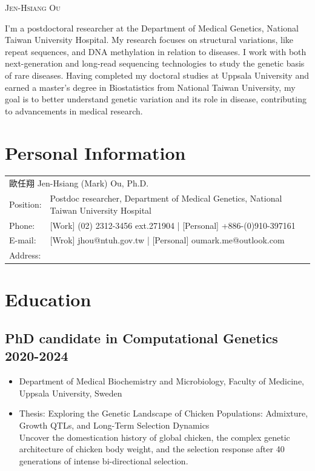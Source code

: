 \documentclass[10pt]{article}
\makeatletter
\def\phone{+886-(0)910-397161}
\def\address{7F.-3, No. 7, Dongfeng St., Taipei, Taiwan}
\def\email{oumark.me@outlook.com}
\def\web{www.oumark.net}
\makeatother
\begin{document}
\begin{center}
{\LARGE\scshape Jen-Hsiang Ou}\\[2pt]
\end{center}


\vspace{16pt}
I'm a postdoctoral researcher at the Department of Medical Genetics, National Taiwan University Hospital. My research focuses on structural variations, like repeat sequences, and DNA methylation in relation to diseases. I work with both next-generation and long-read sequencing technologies to study the genetic basis of rare diseases. Having completed my doctoral studies at Uppsala University and earned a master's degree in Biostatistics from National Taiwan University, my goal is to better understand genetic variation and its role in disease, contributing to advancements in medical research.

\section*{Personal Information}
\begin{tabular}{ll}
    \multicolumn{2}{l}{歐任翔 Jen-Hsiang (Mark) Ou, Ph.D.}  \\
    Position: & Postdoc researcher, Department of Medical Genetics, National Taiwan University Hospital\\
    Phone: & [Work] (02) 2312-3456 ext.271904 | [Personal] +886-(0)910-397161 \\
    E-mail: & [Wrok] jhou@ntuh.gov.tw | [Personal] oumark.me@outlook.com \\
    Address: & \\
\end{tabular}


\section*{Education}

\subsection*{PhD candidate in Computational Genetics \hfill 2020-2024}
\begin{itemize}
\item Department of Medical Biochemistry and Microbiology, Faculty of Medicine, Uppsala University, Sweden
\item Thesis: Exploring the Genetic Landscape of Chicken Populations: Admixture, Growth QTLs, and Long-Term Selection Dynamics \\ {\color{gray} Uncover the domestication history of global chicken, the complex genetic architecture of chicken body weight, and the selection response after 40 generations of intense bi-directional selection.}
\end{itemize}
\end{document}
